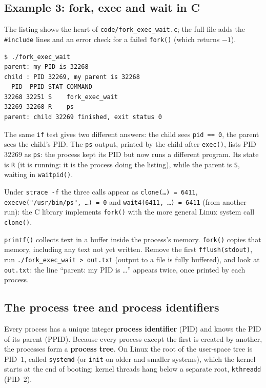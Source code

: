 \documentclass[11pt,a4paper]{article}
\newcommand{\term}[1]{\textbf{\color{mintdeep}#1}}
\newcommand{\cmd}[1]{\texttt{#1}}
\begin{document}
\subsection{Example 3: fork, exec and wait in C}

The listing shows the heart of \texttt{code/fork\_exec\_wait.c}; the full file adds the \texttt{\#include} lines and an error check for a failed \cmd{fork()} (which returns $-1$).



\begin{lstlisting}[style=term]
$ ./fork_exec_wait
parent: my PID is 32268
child : PID 32269, my parent is 32268
  PID  PPID STAT COMMAND
32268 32251 S    fork_exec_wait
32269 32268 R    ps
parent: child 32269 finished, exit status 0
\end{lstlisting}

The same \texttt{if} test gives two different answers: the child sees \texttt{pid == 0}, the parent sees the child's PID. The \cmd{ps} output, printed by the child after \cmd{exec()}, lists PID $32269$ as \texttt{ps}: the process kept its PID but now runs a different program. Its state is \texttt{R} (it is running: it is the process doing the listing), while the parent is \texttt{S}, waiting in \cmd{waitpid()}.

Under \cmd{strace -f} the three calls appear as \cmd{clone(\dots) = 6411}, \cmd{execve("/usr/bin/ps", \dots) = 0} and \cmd{wait4(6411, \dots) = 6411} (from another run): the C library implements \cmd{fork()} with the more general Linux system call \cmd{clone()}.

\begin{tryit}
\cmd{printf()} collects text in a buffer inside the process's memory. \cmd{fork()} copies that memory, including any text not yet written. Remove the first \cmd{fflush(stdout)}, run \cmd{./fork\_exec\_wait > out.txt} (output to a file is fully buffered), and look at \texttt{out.txt}: the line ``parent: my PID is \dots'' appears twice, once printed by each process.
\end{tryit}


\subsection{The process tree and process identifiers}

Every process has a unique integer \term{process identifier} (PID) and knows the PID of its parent (PPID). Because every process except the first is created by another, the processes form a \term{process tree}. On Linux the root of the user-space tree is PID~$1$, called \cmd{systemd} (or \cmd{init} on older and smaller systems), which the kernel starts at the end of booting; kernel threads hang below a separate root, \cmd{kthreadd} (PID~$2$).
\end{document}
